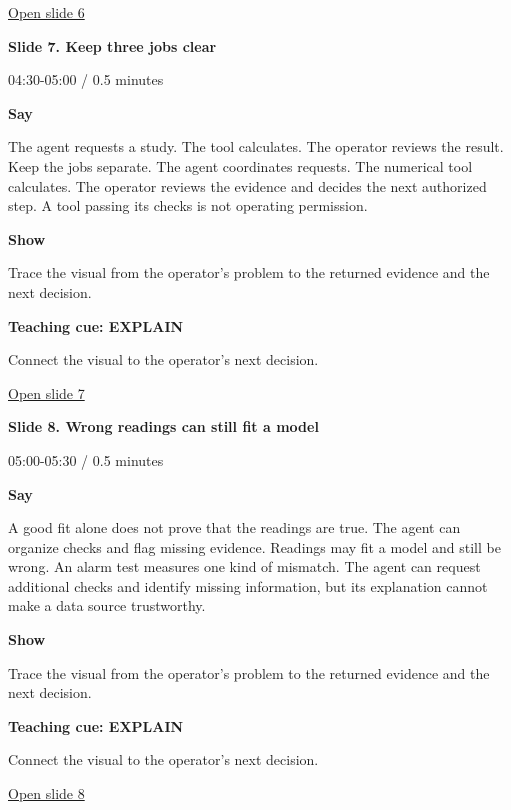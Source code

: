 \documentclass[12pt,letterpaper]{article}
\begin{document}
\vfill\href{https://alaaselim-sudo.github.io/GridGuard-Agentic-AI-Tutorials/operator-cases/#/6}{Open slide 6}\par
\clearpage{}
{\Large\bfseries\color{IEEEBlue} Slide 7. Keep three jobs clear\par}\medskip
{\small\color{Slate} 04:30-05:00 /\allowbreak{} 0.5 minutes\par}\medskip
\textbf{Say}\par The agent requests a study. The tool calculates. The operator reviews the result. Keep the jobs separate. The agent coordinates requests. The numerical tool calculates. The operator reviews the evidence and decides the next authorized step. A tool passing its checks is not operating permission.\par\medskip
\textbf{Show}\par Trace the visual from the operator's problem to the returned evidence and the next decision.\par\medskip
\textbf{Teaching cue: EXPLAIN}\par Connect the visual to the operator's next decision.\par\medskip
\vfill\href{https://alaaselim-sudo.github.io/GridGuard-Agentic-AI-Tutorials/operator-cases/#/7}{Open slide 7}\par
\clearpage{}
{\Large\bfseries\color{IEEEBlue} Slide 8. Wrong readings can still fit a model\par}\medskip
{\small\color{Slate} 05:00-05:30 /\allowbreak{} 0.5 minutes\par}\medskip
\textbf{Say}\par A good fit alone does not prove that the readings are true. The agent can organize checks and flag missing evidence. Readings may fit a model and still be wrong. An alarm test measures one kind of mismatch. The agent can request additional checks and identify missing information, but its explanation cannot make a data source trustworthy.\par\medskip
\textbf{Show}\par Trace the visual from the operator's problem to the returned evidence and the next decision.\par\medskip
\textbf{Teaching cue: EXPLAIN}\par Connect the visual to the operator's next decision.\par\medskip
\vfill\href{https://alaaselim-sudo.github.io/GridGuard-Agentic-AI-Tutorials/operator-cases/#/8}{Open slide 8}\par
\end{document}
